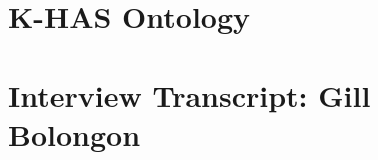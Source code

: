 \begin{appendices}
\chapter{K-HAS Ontology}\label{appendix:ontology}

\chapter{Interview Transcript: Gill Bolongon}\label{appendix:interview}

\end{appendices}